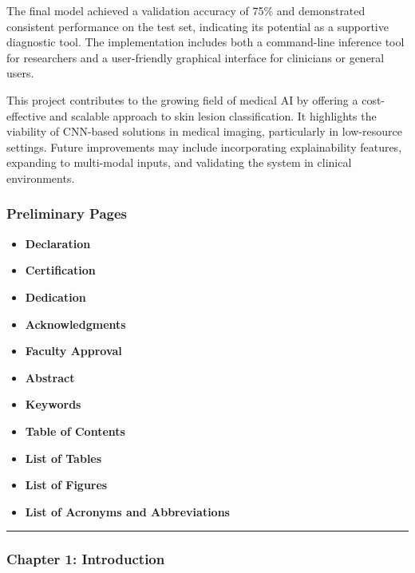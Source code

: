 \documentclass[
  12pt,
  oneside]{article}
\providecommand{\tightlist}{%
  \setlength{\itemsep}{0pt}\setlength{\parskip}{0pt}}
\begin{document}
The final model achieved a validation accuracy of 75\% and demonstrated consistent performance on the test set, indicating its potential as a supportive diagnostic tool. The implementation includes both a command-line inference tool for researchers and a user-friendly graphical interface for clinicians or general users.

This project contributes to the growing field of medical AI by offering a cost-effective and scalable approach to skin lesion classification. It highlights the viability of CNN-based solutions in medical imaging, particularly in low-resource settings. Future improvements may include incorporating explainability features, expanding to multi-modal inputs, and validating the system in clinical environments.

\vfill
\clearpage

{
\setcounter{tocdepth}{3}
\tableofcontents
}
\subsubsection{Preliminary Pages}\label{preliminary-pages}

\begin{itemize}
\tightlist
\item
  \textbf{Declaration}
\item
  \textbf{Certification}
\item
  \textbf{Dedication}
\item
  \textbf{Acknowledgments}
\item
  \textbf{Faculty Approval}
\item
  \textbf{Abstract}
\item
  \textbf{Keywords}
\item
  \textbf{Table of Contents}
\item
  \textbf{List of Tables}
\item
  \textbf{List of Figures}
\item
  \textbf{List of Acronyms and Abbreviations}
\end{itemize}

\begin{center}\rule{0.5\linewidth}{0.5pt}\end{center}

\subsubsection{Chapter 1: Introduction}\label{chapter-1-introduction}
\end{document}
